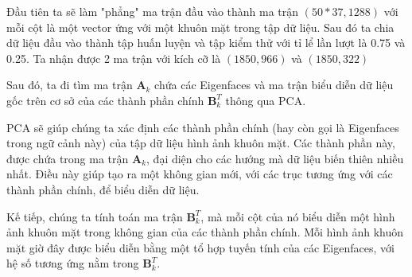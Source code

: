 \documentclass[12pt,a4paper,oneside]{report}
\numberwithin{equation}{section}
\begin{document}
Đầu tiên ta sẽ làm "phẳng" ma trận đầu vào thành ma trận $(50*37,1288)$ với mỗi cột là một vector ứng với một khuôn mặt trong tập dữ liệu. Sau đó ta chia dữ liệu đầu vào thành tập huấn luyện và tập kiểm thử với tỉ lể lần lượt là 0.75 và 0.25. Ta nhận được 2 ma trận với kích cỡ là $(1850,966)$ và $(1850,322)$

Sau đó, ta đi tìm ma trận $\mathbf{A}_k$ chứa các Eigenfaces và ma trận biểu diễn dữ liệu gốc trên cơ sở của các thành phần chính $\mathbf{B}_k^T$ thông qua PCA.

PCA sẽ giúp chúng ta xác định các thành phần chính (hay còn gọi là Eigenfaces trong ngữ cảnh này) của tập dữ liệu hình ảnh khuôn mặt. Các thành phần này, được chứa trong ma trận $\mathbf{A}_k$, đại diện cho các hướng mà dữ liệu biến thiên nhiều nhất. Điều này giúp tạo ra một không gian mới, với các trục tương ứng với các thành phần chính, để biểu diễn dữ liệu.

Kế tiếp, chúng ta tính toán ma trận $\mathbf{B}_k^T$, mà mỗi cột của nó biểu diễn một hình ảnh khuôn mặt trong không gian của các thành phần chính. Mỗi hình ảnh khuôn mặt giờ đây được biểu diễn bằng một tổ hợp tuyến tính của các Eigenfaces, với hệ số tương ứng nằm trong $\mathbf{B}_k^T$.
\end{document}
